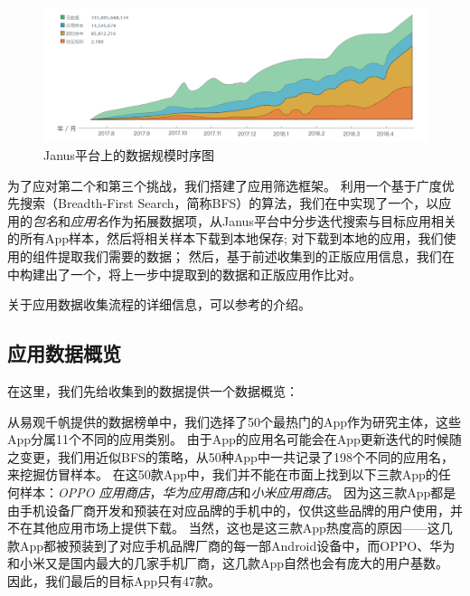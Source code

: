 \begin{figure}[htbp]
	\centering
	\includegraphics[width=\textwidth]{./Figures/edwin-Janus-data.png}
	\caption{Janus平台上的数据规模时序图}
	\label{fig:Janus-data}
	\vspace{-5mm}
\end{figure}

为了应对第二个和第三个挑战，我们搭建了应用筛选框架\mytool。
利用一个基于广度优先搜索（Breadth-First Search，简称BFS）的算法，我们在\mytool 中实现了一个\componentB ，以应用的\emph{包名}和\emph{应用名}作为拓展数据项，从Janus平台中分步迭代搜索与目标应用相关的所有App样本，然后将相关样本下载到本地保存;
对下载到本地的应用，我们使用\mytool 的组件\componentA 提取我们需要的数据；
然后，基于前述收集到的正版应用信息，我们在\mytool 中构建出了一个\componentC ，将上一步中提取到的数据和正版应用作比对。

关于应用数据收集流程的详细信息，可以参考的介绍。

\subsection{应用数据概览}
在这里，我们先给收集到的数据提供一个数据概览：

从易观千帆提供的数据榜单中，我们选择了50个最热门的App作为研究主体，这些App分属11个不同的应用类别。
由于App的应用名可能会在App更新迭代的时候随之变更，我们用近似BFS的策略，从50种App中一共记录了198个不同的应用名，来挖掘仿冒样本。
在这50款App中，我们并不能在市面上找到以下三款App的任何样本：\emph{OPPO 应用商店}，\emph{华为应用商店}和\emph{小米应用商店}。
因为这三款App都是由手机设备厂商开发和预装在对应品牌的手机中的，仅供这些品牌的用户使用，并不在其他应用市场上提供下载。
当然，这也是这三款App热度高的原因——这几款App都被预装到了对应手机品牌厂商的每一部Android设备中，而OPPO、华为和小米又是国内最大的几家手机厂商，这几款App自然也会有庞大的用户基数。
因此，我们最后的目标App只有47款。

